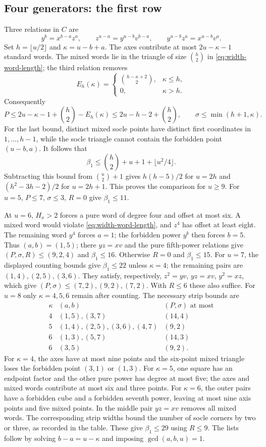 \subsection{Four generators: the first row}

Three relations in $C$ are
\[
 y^b=x^{b-a}z^a,\qquad
 z^{u-a}=y^{u-b}v^{b-a},\qquad
 y^{u-b}z^a=x^{u-b}v^a.
\]
Set $h=\lfloor u/2\rfloor$ and $\kappa=u-b+a$.
The axes contribute at most $2u-\kappa-1$ standard words.
The mixed words lie in the triangle of size $\binom h2$ in
\eqref{eq:width-word-length}; the third relation removes
\[
 E_h(\kappa)=
 \begin{cases}\binom{h-\kappa+2}2,&\kappa\le h,\\0,&\kappa>h.\end{cases}
\]
Consequently
\[
 P\le2u-\kappa-1+\binom h2-E_h(\kappa)
       \le2u-h-2+\binom h2,\qquad
 \sigma\le\min(h+1,\kappa).
\]
For the last bound, distinct mixed socle points have distinct first
coordinates in $1,\ldots,h-1$, while the socle triangle cannot contain
the forbidden point $(u-b,a)$.
It follows that
\[
 \beta_1\le\binom h2+u+1+\lfloor u^2/4\rfloor.
\]
Subtracting this bound from $\binom u2+1$ gives $h(h-5)/2$ for $u=2h$ and
$(h^2-3h-2)/2$ for $u=2h+1$.
This proves the comparison for $u\ge9$.
For $u=5$, $P\le7$, $\sigma\le3$, $R=0$ give $\beta_1\le11$.

At $u=6$, $H_x>2$ forces a pure word of degree four and offset at
most six.  A mixed word would violate \eqref{eq:width-word-length},
and $z^4$ has offset at least eight.  The remaining word $y^4$ forces
$a=1$; the forbidden power $y^b$ then forces $b=5$.
Thus $(a,b)=(1,5)$; there $yz=xv$ and the pure
fifth-power relations give $(P,\sigma,R)\le(9,2,4)$ and
$\beta_1\le16$.  Otherwise $R=0$ and $\beta_1\le15$.
For $u=7$, the displayed counting bounds give $\beta_1\le22$ unless
$\kappa=4$; the remaining pairs are $(1,4),(2,5),(3,6)$.
They satisfy, respectively, $z^2=yv$, $yz=xv$, $y^2=xz$, which give
$(P,\sigma)\le(7,2),(9,2),(7,2)$.
With $R\le6$ these also suffice.
For $u=8$ only $\kappa=4,5,6$ remain after counting.  The necessary
strip bounds are
\[
\begin{array}{c|c|c}
 \kappa&(a,b)&(P,\sigma)\text{ at most}\\\hline
 4&(1,5),(3,7)&(14,4)\\
 5&(1,4),(2,5),(3,6),(4,7)&(9,2)\\
 6&(1,3),(5,7)&(14,3)\\
 6&(3,5)&(9,2).
\end{array}
\]
For $\kappa=4$, the axes have at most nine points and the six-point
mixed triangle loses the forbidden point $(3,1)$ or $(1,3)$.
For $\kappa=5$, one square has an endpoint factor and the other pure
power has degree at most five; the axes and mixed words contribute at
most six and three points.  For $\kappa=6$, the outer pairs have a
forbidden cube and a forbidden seventh power, leaving at most nine
axis points and five mixed points.  In the middle pair $yz=xv$ removes
all mixed words.  The corresponding strip widths bound the number of
socle corners by two or three, as recorded in the table.
These give $\beta_1\le29$ using $R\le9$.
The lists follow by solving $b-a=u-\kappa$ and imposing
$\gcd(a,b,u)=1$.

